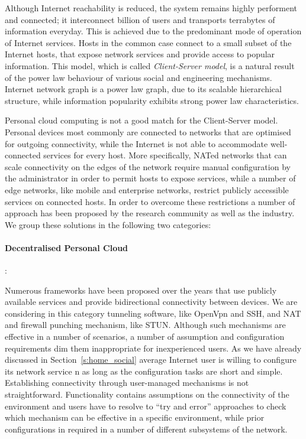 Although Internet reachability is reduced, the system remains highly performent
and connected; it interconnect billion of users and transports terrabytes of
information everyday. This is achieved due to the predominant mode of
operation of Internet services. Hosts in the common case connect to
a small subset of the Internet hosts, that expose network services and 
provide access to popular information. 
This model, which is called {\it Client-Server model}, is a natural result of the
power law behaviour of various social and engineering mechanisms. Internet
network graph is a power law graph, due to its scalable hierarchical structure, 
while information popularity exhibits strong power law characteristics. 

Personal cloud computing is not a good match for the Client-Server model.
Personal devices most commonly are connected to networks that are optimised for
outgoing connectivity, while the Internet is not able to accommodate well-connected
services for every host. More specifically, NATed networks that can scale
connectivity on the edges of the network require manual configuration by the
administrator in order to permit hosts to expose services, while a number of
edge networks, like mobile and enterprise networks, restrict publicly accessible
services on connected hosts. In order to overcome these restrictions a number of
approach has been proposed by the research community as well as the industry. We
group these solutions in the following two categories:

\paragraph*{Decentralised Personal Cloud}: 

Numerous frameworks have been proposed over the years that use publicly
available services and provide bidirectional connectivity between devices. We
are considering in this category tunneling software, like OpenVpn and SSH, and
NAT and firewall punching mechanism, like STUN. Although such mechanisms are
effective in a number of scenarios, a number of assumption and configuration
requirements dim them inappropriate for inexperienced users. As we have already
discussed in Section~\ref{s:home_social} average Internet user is willing to
configure its network service n as long as the configuration tasks are short
and simple. Establishing connectivity through user-managed
mechanisms is not straightforward. Functionality contains assumptions on the
connectivity of the environment and users have to resolve to ``try and error''
approaches to check which mechanism can be effective in a specific environment,
while prior configurations in required in a number of different subsystems of the 
network. 

